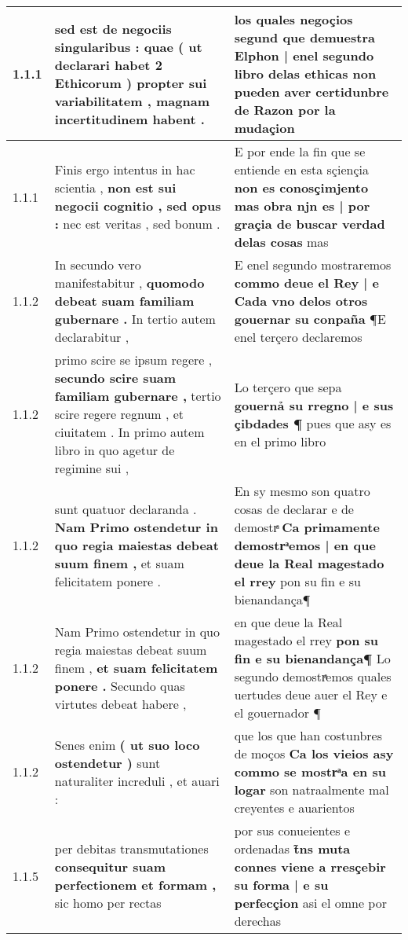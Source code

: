 \begin{tabular}{|p{1cm}|p{6.5cm}|p{6.5cm}|}

\hline
1.1.1 & sed est de negociis singularibus : \textbf{ quae ( ut declarari habet 2 Ethicorum ) propter sui variabilitatem , } magnam incertitudinem habent . & los quales negoçios segund \textbf{ que demuestra Elphon | enel segundo libro delas ethicas non pueden aver certidunbre de Razon } por la mudaçion \\\hline
1.1.1 & Finis ergo intentus in hac scientia , \textbf{ non est sui negocii cognitio , sed opus : } nec est veritas , sed bonum . & E por ende la fin que se entiende en esta sçiençia \textbf{ non es conosçimjento mas obra njn es | por graçia de buscar verdad delas cosas } mas \\\hline
1.1.2 & In secundo vero manifestabitur , \textbf{ quomodo debeat suam familiam gubernare . } In tertio autem declarabitur , & E enel segundo mostraremos \textbf{ commo deue el Rey | e Cada vno delos otros gouernar su conpaña } ¶E enel terçero declaremos \\\hline
1.1.2 & primo scire se ipsum regere , \textbf{ secundo scire suam familiam gubernare , } tertio scire regere regnum , et ciuitatem . In primo autem libro in quo agetur de regimine sui , & Lo terçero que sepa \textbf{ gouernả su rregno | e sus çibdades ¶ } pues que asy es en el primo libro \\\hline
1.1.2 & sunt quatuor declaranda . \textbf{ Nam Primo ostendetur in quo regia maiestas debeat suum finem , } et suam felicitatem ponere . & En sy mesmo son quatro cosas de declarar e de demostrͣ \textbf{ Ca primamente demostrͣemos | en que deue la Real magestado el rrey } pon su fin e su bienandança¶ \\\hline
1.1.2 & Nam Primo ostendetur in quo regia maiestas debeat suum finem , \textbf{ et suam felicitatem ponere . } Secundo quas virtutes debeat habere , & en que deue la Real magestado el rrey \textbf{ pon su fin e su bienandança¶ } Lo segundo demostrͣemos quales uertudes deue auer el Rey e el gouernador ¶ \\\hline
1.1.2 & Senes enim \textbf{ ( ut suo loco ostendetur ) } sunt naturaliter increduli , et auari : & que los que han costunbres de moços \textbf{ Ca los vieios asy commo se mostrͣa en su logar } son natraalmente mal creyentes e auarientos \\\hline
1.1.5 & per debitas transmutationes \textbf{ consequitur suam perfectionem et formam , } sic homo per rectas & por sus conueientes e ordenadas \textbf{ t̃ns muta connes viene a rresçebir su forma | e su perfecçion } asi el omne por derechas \\\hline

\end{tabular}
